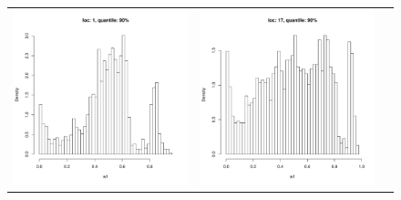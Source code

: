 \begin{figure}[h]
\begin{tabular}{ccc}
\includegraphics[width=\textwidth/3]{../img/loc1/quantile90/histogram.pdf}
&
\includegraphics[width=\textwidth/3]{../img/loc17/quantile90/histogram.pdf}

\end{tabular}
\end{figure}
